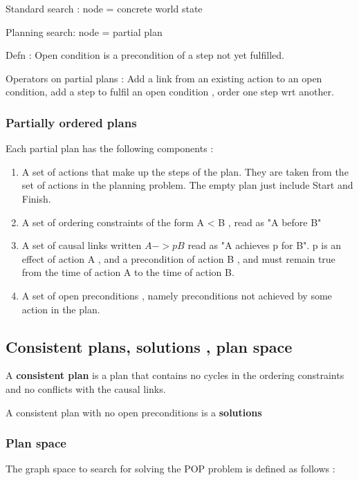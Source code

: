 \documentclass{article}
\begin{document}
Standard search : node = concrete world state

Planning search: node = partial plan

Defn : Open condition is a precondition of a step not yet fulfilled.


Operators on partial plans : Add a link from an existing action to an open condition, add a step to fulfil an open condition , order one step wrt another.

\subsubsection{Partially ordered plans}

Each partial plan has the following components : 

\begin{enumerate}
    \item A set of actions that make up the steps of the plan. They are taken from the set of actions in the planning problem. The empty plan just include Start and Finish.
    \item A set of ordering constraints of the form A < B , read as "A before B"
    \item A set of causal links written $A ->p B $ read as "A achieves p for B". p is an effect of action A , and a precondition of action B , and must remain true from the time of action A to the time of action B.
    \item A set of open preconditions , namely preconditions not achieved by some action in the plan.
\end{enumerate}

\subsection{Consistent plans, solutions , plan space}

A \textbf{consistent plan} is a plan that contains no cycles in the ordering constraints and no conflicts with the causal links.

A consistent plan with no open preconditions is a \textbf{solutions}

\subsubsection{Plan space}

The graph space to search for solving the POP problem is defined as follows : 
\end{document}
